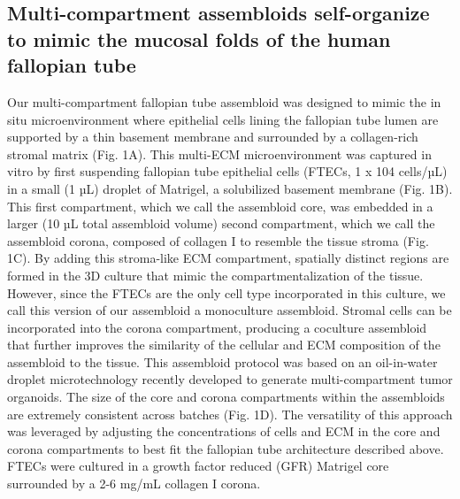 \begin{refsection}
    \subsection{Multi-compartment assembloids self-organize to mimic the mucosal folds of the human fallopian tube}
    Our multi-compartment fallopian tube assembloid was designed to mimic the in situ microenvironment where epithelial cells lining the fallopian tube lumen are supported by a thin basement membrane and surrounded by a collagen-rich stromal matrix (Fig. 1A). This multi-ECM microenvironment was captured in vitro by first suspending fallopian tube epithelial cells (FTECs, 1 x 104 cells/µL) in a small (1 µL) droplet of Matrigel, a solubilized basement membrane (Fig. 1B). This first compartment, which we call the assembloid core, was embedded in a larger (10 µL total assembloid volume) second compartment, which we call the assembloid corona, composed of collagen I to resemble the tissue stroma (Fig. 1C). By adding this stroma-like ECM compartment, spatially distinct regions are formed in the 3D culture that mimic the compartmentalization of the tissue. However, since the FTECs are the only cell type incorporated in this culture, we call this version of our assembloid a monoculture assembloid. Stromal cells can be incorporated into the corona compartment, producing a coculture assembloid that further improves the similarity of the cellular and ECM composition of the assembloid to the tissue. This assembloid protocol was based on an oil-in-water droplet microtechnology recently developed to generate multi-compartment tumor organoids\cite{lee2022a}. The size of the core and corona compartments within the assembloids are extremely consistent across batches (Fig. 1D). The versatility of this approach was leveraged by adjusting the concentrations of cells and ECM in the core and corona compartments to best fit the fallopian tube architecture described above. FTECs were cultured in a growth factor reduced (GFR) Matrigel core surrounded by a 2-6 mg/mL collagen I corona. 

\end{refsection}
